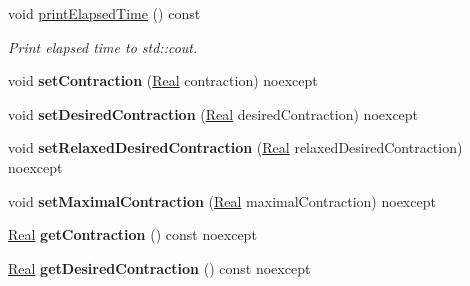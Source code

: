 \begin{DoxyCompactItemize}
\item 
\hypertarget{classSpacy_1_1Mixin_1_1Timer_a3b79b35213702118d0823f6040d5a315}{void \hyperlink{classSpacy_1_1Mixin_1_1Timer_a3b79b35213702118d0823f6040d5a315}{print\-Elapsed\-Time} () const}\label{classSpacy_1_1Mixin_1_1Timer_a3b79b35213702118d0823f6040d5a315}

\begin{DoxyCompactList}\small\item\em \-Print elapsed time to std\-::cout. \end{DoxyCompactList}\item 
\hypertarget{classSpacy_1_1Mixin_1_1ContractionRate_ab9215981f0454bd5d641abad582e64e5}{void {\bfseries set\-Contraction} (\hyperlink{classSpacy_1_1Real}{\-Real} contraction) noexcept}\label{classSpacy_1_1Mixin_1_1ContractionRate_ab9215981f0454bd5d641abad582e64e5}

\item 
\hypertarget{classSpacy_1_1Mixin_1_1ContractionRate_a26eaa6344b5b2191931a9fd87ed96f39}{void {\bfseries set\-Desired\-Contraction} (\hyperlink{classSpacy_1_1Real}{\-Real} desired\-Contraction) noexcept}\label{classSpacy_1_1Mixin_1_1ContractionRate_a26eaa6344b5b2191931a9fd87ed96f39}

\item 
\hypertarget{classSpacy_1_1Mixin_1_1ContractionRate_ac6e47c0ab683643fea7490703f02632d}{void {\bfseries set\-Relaxed\-Desired\-Contraction} (\hyperlink{classSpacy_1_1Real}{\-Real} relaxed\-Desired\-Contraction) noexcept}\label{classSpacy_1_1Mixin_1_1ContractionRate_ac6e47c0ab683643fea7490703f02632d}

\item 
\hypertarget{classSpacy_1_1Mixin_1_1ContractionRate_acc99ba536cd9a027baa50a1412d9d216}{void {\bfseries set\-Maximal\-Contraction} (\hyperlink{classSpacy_1_1Real}{\-Real} maximal\-Contraction) noexcept}\label{classSpacy_1_1Mixin_1_1ContractionRate_acc99ba536cd9a027baa50a1412d9d216}

\item 
\hypertarget{classSpacy_1_1Mixin_1_1ContractionRate_a49a83927f070d2dd600966f491f1f304}{\hyperlink{classSpacy_1_1Real}{\-Real} {\bfseries get\-Contraction} () const noexcept}\label{classSpacy_1_1Mixin_1_1ContractionRate_a49a83927f070d2dd600966f491f1f304}

\item 
\hypertarget{classSpacy_1_1Mixin_1_1ContractionRate_a3704d54e5015a9b7d9cdc2c01f41b205}{\hyperlink{classSpacy_1_1Real}{\-Real} {\bfseries get\-Desired\-Contraction} () const noexcept}\label{classSpacy_1_1Mixin_1_1ContractionRate_a3704d54e5015a9b7d9cdc2c01f41b205}


\end{DoxyCompactItemize}
